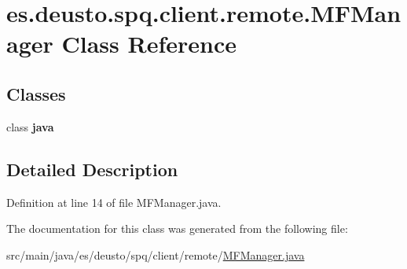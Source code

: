\hypertarget{classes_1_1deusto_1_1spq_1_1client_1_1remote_1_1_m_f_manager}{}\section{es.\+deusto.\+spq.\+client.\+remote.\+M\+F\+Manager Class Reference}
\label{classes_1_1deusto_1_1spq_1_1client_1_1remote_1_1_m_f_manager}
\subsection*{Classes}
\begin{DoxyCompactItemize}
\item 
class {\bfseries java}
\end{DoxyCompactItemize}


\subsection{Detailed Description}


Definition at line 14 of file M\+F\+Manager.\+java.



The documentation for this class was generated from the following file\+:\begin{DoxyCompactItemize}
\item 
src/main/java/es/deusto/spq/client/remote/\hyperlink{_m_f_manager_8java}{M\+F\+Manager.\+java}\end{DoxyCompactItemize}
